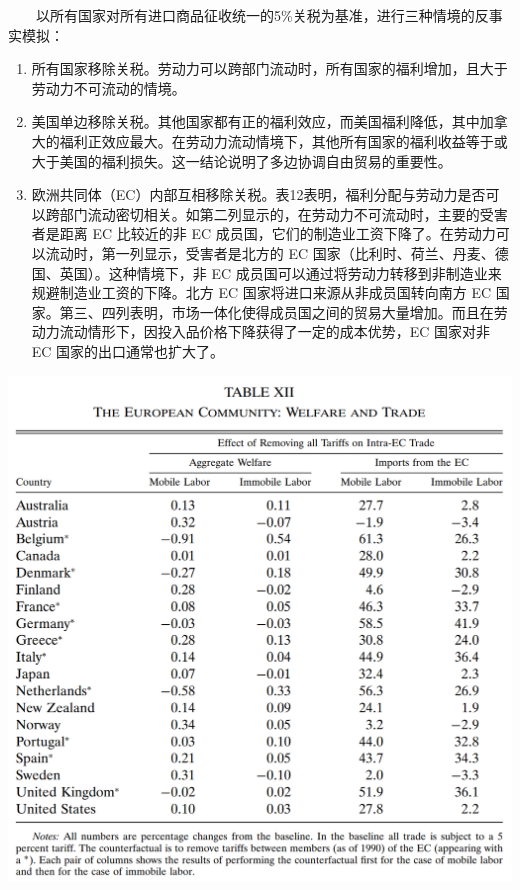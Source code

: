 \documentclass[]{article}
\begin{document}
　　以所有国家对所有进口商品征收统一的5\%关税为基准，进行三种情境的反事实模拟：

\begin{enumerate}
\def\labelenumi{\arabic{enumi}.}
\item
  所有国家移除关税。劳动力可以跨部门流动时，所有国家的福利增加，且大于劳动力不可流动的情境。
\item
  美国单边移除关税。其他国家都有正的福利效应，而美国福利降低，其中加拿大的福利正效应最大。在劳动力流动情境下，其他所有国家的福利收益等于或大于美国的福利损失。这一结论说明了多边协调自由贸易的重要性。
\item
  欧洲共同体（EC）内部互相移除关税。表12表明，福利分配与劳动力是否可以跨部门流动密切相关。如第二列显示的，在劳动力不可流动时，主要的受害者是距离 EC 比较近的非 EC 成员国，它们的制造业工资下降了。在劳动力可以流动时，第一列显示，受害者是北方的 EC 国家（比利时、荷兰、丹麦、德国、英国）。这种情境下，非 EC 成员国可以通过将劳动力转移到非制造业来规避制造业工资的下降。北方 EC 国家将进口来源从非成员国转向南方 EC 国家。第三、四列表明，市场一体化使得成员国之间的贸易大量增加。而且在劳动力流动情形下，因投入品价格下降获得了一定的成本优势，EC 国家对非 EC 国家的出口通常也扩大了。
\end{enumerate}

\begin{center}\includegraphics[width=1\linewidth]{Figures/Table12} \end{center}
\end{document}
